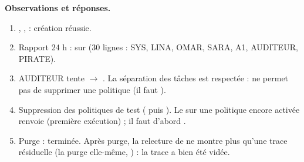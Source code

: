 \textbf{Observations et réponses.}
\begin{enumerate}
  \item {}, ,  : cr\'eation r\'eussie.
  \item Rapport 24 h :  sur
         (30 lignes : SYS, LINA, OMAR, SARA, A1, AUDITEUR, PIRATE).
  \item AUDITEUR tente  $\to$ . La
        s\'eparation des tâches est respectée :  ne permet pas de supprimer une politique (il faut
        ).
  \item Suppression des politiques de test ( puis ). Le  sur une
        politique encore activée renvoie  (première exécution) ; il faut d'abord .
  \item Purge :  termin\'ee. Après purge, la relecture de
         ne montre plus qu'une trace r\'esiduelle (la purge elle-même, ) : la trace a bien été vidée.
\end{enumerate}
